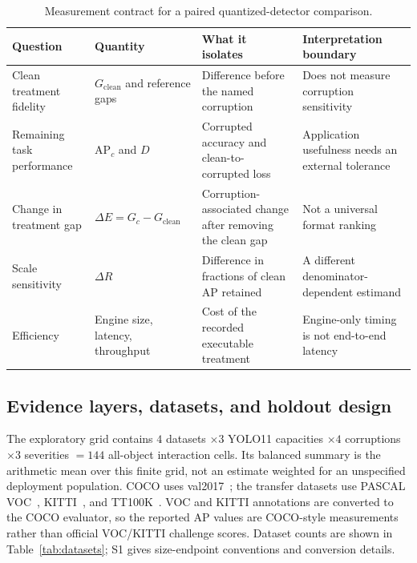 \documentclass[a4paper,fleqn]{cas-dc}
\newcommand{\AP}{\mathrm{AP}}
\begin{document}
\begin{table}[t]
\centering
\caption{Measurement contract for a paired quantized-detector comparison.}
\label{tab:measurement-contract}
\small
\setlength{\tabcolsep}{4pt}
\renewcommand{\arraystretch}{1.16}
\begin{tabular}{Y{2.7cm}Y{3.0cm}Y{4.3cm}Y{4.1cm}}
\toprule
Question & Quantity & What it isolates & Interpretation boundary\\
\midrule
Clean treatment fidelity & $G_{\mathrm{clean}}$ and reference gaps & Difference before the named corruption & Does not measure corruption sensitivity\\
Remaining task performance & $\AP_c$ and $D$ & Corrupted accuracy and clean-to-corrupted loss & Application usefulness needs an external tolerance\\
Change in treatment gap & $\Delta E=G_c-G_{\mathrm{clean}}$ & Corruption-associated change after removing the clean gap & Not a universal format ranking\\
Scale sensitivity & $\Delta R$ & Difference in fractions of clean AP retained & A different denominator-dependent estimand\\
Efficiency & Engine size, latency, throughput & Cost of the recorded executable treatment & Engine-only timing is not end-to-end latency\\
\bottomrule
\end{tabular}
\end{table}

\subsection{Evidence layers, datasets, and holdout design}
\label{sec:evidence-layers}
\label{sec:datasets}
\label{sec:training}

The exploratory grid contains $4$ datasets $\times3$ YOLO11 capacities $\times4$ corruptions $\times3$ severities $=144$ all-object interaction cells. Its balanced summary is the arithmetic mean over this finite grid, not an estimate weighted for an unspecified deployment population. COCO uses val2017~\citep{lin2014coco}; the transfer datasets use PASCAL VOC~\citep{everingham2015voc}, KITTI~\citep{geiger2012kitti}, and TT100K~\citep{zhu2016tt100k}. VOC and KITTI annotations are converted to the COCO evaluator, so the reported AP values are COCO-style measurements rather than official VOC/KITTI challenge scores. Dataset counts are shown in Table~\ref{tab:datasets}; S1 gives size-endpoint conventions and conversion details.
\end{document}
